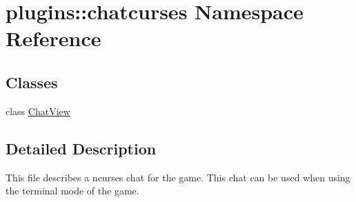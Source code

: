 \hypertarget{namespaceplugins_1_1chatcurses}{\section{plugins\-:\-:chatcurses \-Namespace \-Reference}
\label{namespaceplugins_1_1chatcurses}
}
\subsection*{\-Classes}
\begin{DoxyCompactItemize}
\item 
class \hyperlink{classplugins_1_1chatcurses_1_1_chat_view}{\-Chat\-View}
\end{DoxyCompactItemize}


\subsection{\-Detailed \-Description}
\begin{DoxyVerb}
This file describes a ncurses chat for the game.
This chat can be used when using the terminal mode of the game.
\end{DoxyVerb}
 